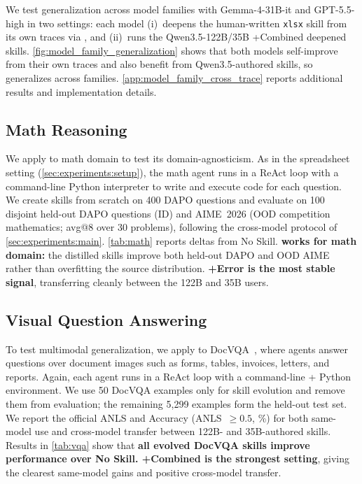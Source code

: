 We test generalization across model families with Gemma-4-31B-it and GPT-5.5-high in two settings: each model (i)~deepens the human-written \texttt{xlsx} skill from its own traces via \systemname{}, and (ii)~runs the Qwen3.5-122B/35B +Combined deepened skills. \cref{fig:model_family_generalization} shows that both models self-improve from their own traces and also benefit from Qwen3.5-authored skills, so \systemname{} generalizes across families. \cref{app:model_family_cross_trace} reports additional results and implementation details.


\begin{table}[!t]
\centering
\begin{minipage}[t]{0.48\linewidth}

\end{minipage}\hfill
\begin{minipage}[t]{0.48\linewidth}

\end{minipage}
\end{table}

\subsection{Math Reasoning}
\label{sec:experiments:math}
We apply \systemname{} to math domain to test its domain-agnosticism.
As in the spreadsheet setting (\cref{sec:experiments:setup}), the math agent runs in a ReAct loop with a command-line Python interpreter to write and execute code for each question.
We create skills from scratch on 400 DAPO questions \citep{yu2025dapo} and evaluate on 100 disjoint held-out DAPO questions (ID) and AIME~2026 (OOD competition mathematics; avg@8 over 30 problems), following the cross-model protocol of \cref{sec:experiments:main}.
\cref{tab:math} reports deltas from No Skill.
\textbf{\systemname{} works for math domain:} the distilled skills improve both held-out DAPO and OOD AIME rather than overfitting the source distribution.
\textbf{+Error is the most stable signal}, transferring cleanly between the 122B and 35B users.

\subsection{Visual Question Answering}
\label{sec:experiments:vqa}

To test multimodal generalization, we apply \systemname{} to DocVQA~\citep{mathew2020docvqa}, where agents answer questions over document images such as forms, tables, invoices, letters, and reports.
Again, each agent runs in a ReAct loop with a command-line + Python environment.
We use 50 DocVQA examples only for skill evolution and remove them from evaluation; the remaining 5{,}299 examples form the held-out test set.
We report the official ANLS and Accuracy (ANLS~$\geq 0.5$, \%) for both same-model use and cross-model transfer between 122B- and 35B-authored skills. Results in \cref{tab:vqa} show that \textbf{all
evolved DocVQA skills improve performance over No Skill. +Combined is the strongest setting}, giving the clearest same-model gains and positive cross-model transfer.

